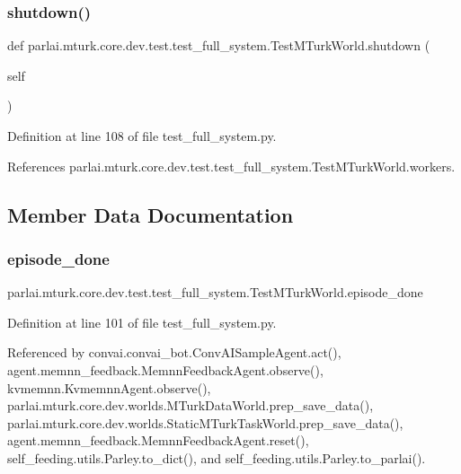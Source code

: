 \subsubsection{\texorpdfstring{shutdown()}{shutdown()}}
{\footnotesize\ttfamily def parlai.\+mturk.\+core.\+dev.\+test.\+test\+\_\+full\+\_\+system.\+Test\+M\+Turk\+World.\+shutdown (\begin{DoxyParamCaption}\item[{}]{self }\end{DoxyParamCaption})}



Definition at line 108 of file test\+\_\+full\+\_\+system.\+py.



References parlai.\+mturk.\+core.\+dev.\+test.\+test\+\_\+full\+\_\+system.\+Test\+M\+Turk\+World.\+workers.



\subsection{Member Data Documentation}
\mbox{\label{classparlai_1_1mturk_1_1core_1_1dev_1_1test_1_1test__full__system_1_1TestMTurkWorld_a2a95e6618784cdab5f276f557bfee83e}} 
\subsubsection{\texorpdfstring{episode\+\_\+done}{episode\_done}}
{\footnotesize\ttfamily parlai.\+mturk.\+core.\+dev.\+test.\+test\+\_\+full\+\_\+system.\+Test\+M\+Turk\+World.\+episode\+\_\+done}



Definition at line 101 of file test\+\_\+full\+\_\+system.\+py.



Referenced by convai.\+convai\+\_\+bot.\+Conv\+A\+I\+Sample\+Agent.\+act(), agent.\+memnn\+\_\+feedback.\+Memnn\+Feedback\+Agent.\+observe(), kvmemnn.\+Kvmemnn\+Agent.\+observe(), parlai.\+mturk.\+core.\+dev.\+worlds.\+M\+Turk\+Data\+World.\+prep\+\_\+save\+\_\+data(), parlai.\+mturk.\+core.\+dev.\+worlds.\+Static\+M\+Turk\+Task\+World.\+prep\+\_\+save\+\_\+data(), agent.\+memnn\+\_\+feedback.\+Memnn\+Feedback\+Agent.\+reset(), self\+\_\+feeding.\+utils.\+Parley.\+to\+\_\+dict(), and self\+\_\+feeding.\+utils.\+Parley.\+to\+\_\+parlai().

